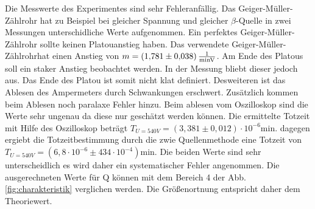 Die Messwerte des Experimentes sind sehr Fehleranfällig. Das Geiger-Müller-Zählrohr hat zu Beispiel bei gleicher Spannung und gleicher $\beta$-Quelle in zwei Messungen unterschidliche Werte aufgenommen.
Ein perfektes Geiger-Müller-Zählrohr sollte keinen Platouanstieg haben. Das verwendete Geiger-Müller-Zählrohrhat einen Anstieg von $m=\SI{1,781 \pm 0,038}{\frac{1}{min V}}$.
Am Ende des Platous soll ein staker Anstieg beobachtet werden. In der Messung bliebt dieser jedoch aus. Das Ende des Platou ist somit nicht klat definiert.
Desweiteren ist das Ablesen des Ampermeters durch Schwankungen erschwert. Zusätzlich kommen beim Ablesen noch paralaxe Fehler hinzu.
Beim ablesen vom Oszilloskop sind die Werte sehr ungenau da diese nur geschätzt werden können.
Die ermittelte Totzeit mit Hilfe des Oszilloskop beträgt  $T_{U=540V} = (3,381 \pm 0,012)\cdot 10^{-6} {\text{min}} $.
dagegen ergiebt die Totzeitbestimmung durch die zwie Quellenmethode eine Totzeit von $T_{U=540V} = (6,8\cdot10^{-6}\pm 434\cdot10^{−4}){\text{min}}$.
Die beiden Werte sind sehr unterscheidlich es wird daher ein systematischer Fehler angenommen.
Die ausgerechneten Werte für Q können mit dem Bereich 4 der Abb. \ref{fig:charakteristik} verglichen werden. Die Größenortnung entspricht daher dem Theoriewert.
